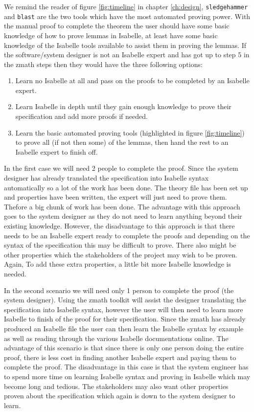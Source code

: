 We remind the reader of figure \ref{fig:timeline} in chapter \ref{ch:design}, \verb|sledgehammer| and \verb|blast| are the two tools which have the most automated proving power. With the manual proof to complete the theorem the user should have some basic knowledge of how to prove lemmas in Isabelle, at least have some basic knowledge of the Isabelle tools available to assist them in proving the lemmas. If the software/system designer is not an Isabelle expert and has got up to step 5 in the \gls{zmath} steps then they would have the three following options:

\begin{enumerate}
\item Learn no Isabelle at all and pass on the proofs to be completed by an Isabelle expert.

\item Learn Isabelle in depth until they gain enough knowledge to prove their specification and add more proofs if needed.

\item Learn the basic automated proving tools (highlighted in figure \ref{fig:timeline}) to prove all (if not then some) of the lemmas, then hand the rest to an Isabelle expert to finish off.
\end{enumerate}

In the first case we will need 2 people to complete the proof. Since the system designer has already translated the specification into Isabelle syntax automatically so a lot of the work has been done. The theory file has been set up and properties have been written, the expert will just need to prove them. Thefore a big chunk of work has been done. The advantage with this approach goes to the system designer as they do not need to learn anything beyond their existing knowledge. However, the disadvantage to this approach is that there needs to be an Isabelle expert ready to complete the proofs and depending on the syntax of the specification this may be difficult to prove. There also might be other properties which the stakeholders of the project may wish to be proven. Again, To add these extra properties, a little bit more Isabelle knowledge is needed.

In the second scenario we will need only 1 person to complete the proof (the system designer). Using the \gls{zmath} toolkit will assist the designer translating the specification into Isabelle syntax, however the user will then need to learn more Isabelle to finish of the proof for their specification. Since the \gls{zmath} has already produced an Isabelle file the user can then learn the Isabelle syntax by example as well as reading through the various Isabelle documentations online. The advantage of this scenario is that since there is only one person doing the entire proof, there is less cost in finding another Isabelle expert and paying them to complete the proof. The disadvantage in this case is that the system engineer has to spend more time on learning Isabelle syntax and proving in Isabelle which may become long and tedious. The stakeholders may also want other properties proven about the specification which again is down to the system designer to learn.

